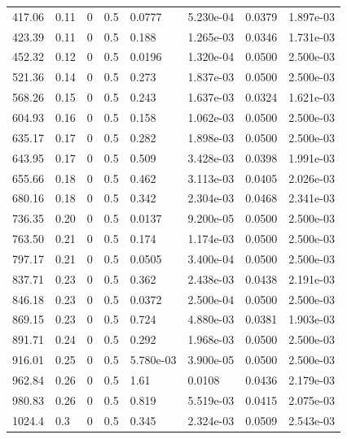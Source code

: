\documentclass[preview]{standalone}
\begin{document}
{{\begin{tabular}{L{1.2cm}C{1.2cm} C{0.3cm}C{0.5cm} C{1.4cm}C{1.4cm} C{1.4cm}C{1.4cm}}
  417.06  &  0.11  & 0     & 0.5 &  0.0777  & 5.230e-04  & 0.0379 &  1.897e-03   \\ 
  423.39  &  0.11  & 0     & 0.5 &  0.188  & 1.265e-03  & 0.0346 &  1.731e-03   \\ 
  452.32  &  0.12  & 0     & 0.5 &  0.0196  & 1.320e-04  & 0.0500 &  2.500e-03   \\ 
  521.36  &  0.14  & 0     & 0.5 &  0.273  & 1.837e-03  & 0.0500 &  2.500e-03   \\ 
  568.26  &  0.15  & 0     & 0.5 &  0.243  & 1.637e-03  & 0.0324 &  1.621e-03   \\ 
  604.93  &  0.16  & 0     & 0.5 &  0.158  & 1.062e-03  & 0.0500 &  2.500e-03   \\ 
  635.17  &  0.17  & 0     & 0.5 &  0.282  & 1.898e-03  & 0.0500 &  2.500e-03   \\ 
  643.95  &  0.17  & 0     & 0.5 &  0.509  & 3.428e-03  & 0.0398 &  1.991e-03   \\ 
  655.66  &  0.18  & 0     & 0.5 &  0.462  & 3.113e-03  & 0.0405 &  2.026e-03   \\ 
  680.16  &  0.18  & 0     & 0.5 &  0.342  & 2.304e-03  & 0.0468 &  2.341e-03   \\ 
  736.35  &  0.20  & 0     & 0.5 &  0.0137  & 9.200e-05  & 0.0500 &  2.500e-03   \\ 
  763.50  &  0.21  & 0     & 0.5 &  0.174  & 1.174e-03  & 0.0500 &  2.500e-03   \\ 
  797.17  &  0.21  & 0     & 0.5 &  0.0505  & 3.400e-04  & 0.0500 &  2.500e-03   \\ 
  837.71  &  0.23  & 0     & 0.5 &  0.362  & 2.438e-03  & 0.0438 &  2.191e-03   \\ 
  846.18  &  0.23  & 0     & 0.5 &  0.0372  & 2.500e-04  & 0.0500 &  2.500e-03   \\ 
  869.15  &  0.23  & 0     & 0.5 &  0.724  & 4.880e-03  & 0.0381 &  1.903e-03   \\ 
  891.71  &  0.24  & 0     & 0.5 &  0.292  & 1.968e-03  & 0.0500 &  2.500e-03   \\ 
  916.01  &  0.25  & 0     & 0.5 &  5.780e-03  & 3.900e-05  & 0.0500 &  2.500e-03   \\ 
  962.84  &  0.26  & 0     & 0.5 &  1.61  & 0.0108  & 0.0436 &  2.179e-03   \\ 
  980.83  &  0.26  & 0     & 0.5 &  0.819  & 5.519e-03  & 0.0415 &  2.075e-03   \\ 
  1024.4  &   0.3  & 0     & 0.5 &  0.345  & 2.324e-03  & 0.0509 &  2.543e-03   \\ 

\end{tabular}}}
\end{document}
